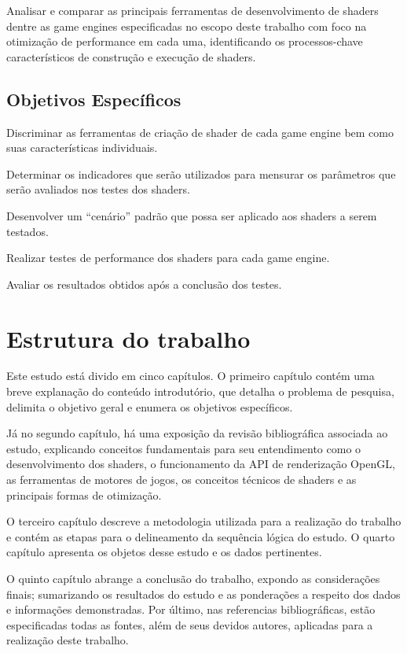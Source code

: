 Analisar e comparar as principais ferramentas de desenvolvimento de shaders dentre as game engines especificadas no escopo deste trabalho com foco na otimização de performance em cada uma, identificando os processos-chave característicos de construção e execução de shaders.

\subsection{Objetivos Específicos}
\label{sec:objetivos-especificos}

	\begin{alineas}
		\item Discriminar as ferramentas de criação de shader de cada game engine bem como suas características individuais.
		\item Determinar os indicadores que serão utilizados para mensurar os parâmetros que serão avaliados nos testes dos shaders.
		\item Desenvolver um “cenário” padrão que possa ser aplicado aos shaders a serem testados.
		\item Realizar testes de performance dos shaders para cada game engine.
		\item Avaliar os resultados obtidos após a conclusão dos testes.
	\end{alineas}

\section{Estrutura do trabalho}
\label{sec:estrutura}

Este estudo está divido em cinco capítulos. O primeiro capítulo contém uma breve explanação do conteúdo introdutório, que detalha o problema de pesquisa, delimita o objetivo geral e enumera os objetivos específicos.

Já no segundo capítulo, há uma exposição da revisão bibliográfica associada ao estudo, explicando conceitos fundamentais para seu entendimento como o desenvolvimento dos shaders, o funcionamento da API de renderização OpenGL, as ferramentas de motores de jogos, os conceitos técnicos de shaders e as principais formas de otimização.

O terceiro capítulo descreve a metodologia utilizada para a realização do trabalho e contém as etapas para o delineamento da sequência lógica do estudo. O quarto capítulo apresenta os objetos desse estudo e os dados pertinentes.

O quinto capítulo abrange a conclusão do trabalho, expondo as considerações finais; sumarizando os resultados do estudo e as ponderações a respeito dos dados e informações demonstradas. Por último, nas referencias bibliográficas, estão especificadas todas as fontes, além de seus devidos autores, aplicadas para a realização deste trabalho.
